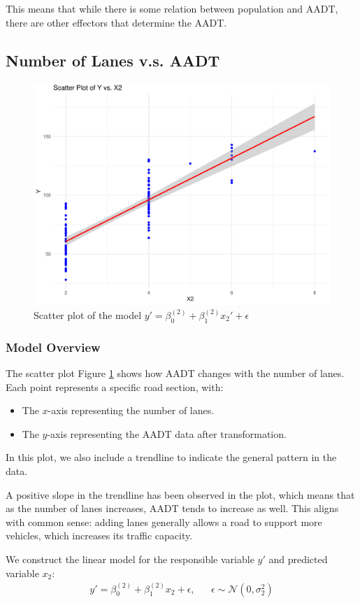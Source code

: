 This means that while there is some relation between population and AADT, there are other effectors that determine the AADT.

\subsection{Number of Lanes v.s. AADT}

\begin{figure}
    \centering
    \includegraphics[width=0.5\linewidth]{figures/x2/scatter_plot}
    \caption{Scatter plot of the model $y' = \beta_0^{(2)} +\beta_1^{(2)} x_2' + \epsilon$}
    \label{fig:x2_scatter}
\end{figure}

\subsubsection{Model Overview}

The scatter plot Figure \ref{fig:x2_scatter} shows how AADT changes with the number of lanes. Each point represents a specific road section, with:
\begin{itemize}
    \item The $x$-axis representing the number of lanes.
    \item The $y$-axis representing the AADT data after transformation.
\end{itemize}

In this plot, we also include a trendline to indicate the general pattern in the data.

A positive slope in the trendline has been observed in the plot, which means that as the number of lanes increases, AADT tends to increase as well. This aligns with common sense: adding lanes generally allows a road to support more vehicles, which increases its traffic capacity.

We construct the linear model for the responsible variable $y'$ and predicted variable $x_2$:
\begin{equation}
\begin{aligned}
y' = \beta_0^{(2)} + \beta_1^{(2)} x_2 + \epsilon, && \epsilon\sim\mathcal{N}(0, \sigma_2^2)
\end{aligned}
\end{equation}

